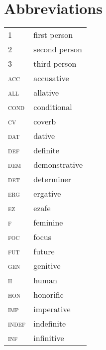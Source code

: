 \documentclass[output=paper]{LSP/langsci}
\begin{document}
\section*{Abbreviations}
\begin{tabularx}{.45\textwidth}{lQ}
\textsc{1} & first person\\
\textsc{2} & second person\\
\textsc{3} & third person\\
\textsc{acc} & accusative\\
\textsc{all} & allative\\
\textsc{cond} & conditional\\
\textsc{cv} & coverb\\
\textsc{dat} & dative\\
\textsc{def} & definite\\
\textsc{dem} & demonstrative\\
\textsc{det} & determiner\\
\textsc{erg} & ergative\\
\textsc{ez} & ezafe\\
\textsc{f} & feminine\\
\textsc{foc} & focus\\
\textsc{fut} & future\\
\textsc{gen} & genitive\\
\textsc{h} & human\\
\textsc{hon} & honorific\\ 
\textsc{imp} & imperative\\
\textsc{indef} & indefinite\\
\textsc{inf} & infinitive\\
\end{tabularx}
\end{document}
